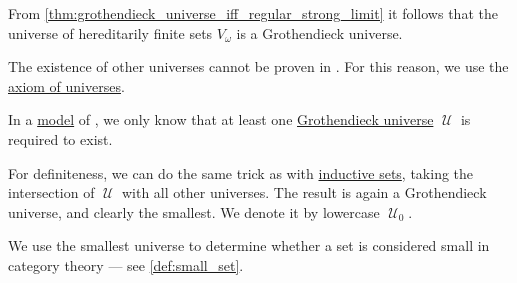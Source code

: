\begin{example}\label{ex:def:axiom_of_universes}
  From \cref{thm:grothendieck_universe_iff_regular_strong_limit} it follows that the universe of hereditarily finite sets \hyperref[def:universe_of_hereditary_finite_sets]{\( V_\omega \)} is a Grothendieck universe.

  The existence of other universes cannot be proven in . For this reason, we use the \hyperref[def:axiom_of_universes]{axiom of universes}.
\end{example}

\begin{definition}\label{def:smallest_grothendieck_universe}\mimprovised
  In a \hyperref[def:fol_semantics/model]{model} of \hyperref[def:axiom_of_universes]{}, we only know that at least one \hyperref[def:grothendieck_universe]{Grothendieck universe} \( \mscrU \) is required to exist.

  For definiteness, we can do the same trick as with \hyperref[def:inductive_set]{inductive sets}, taking the intersection of \( \mscrU \) with all other universes. The result is again a Grothendieck universe, and clearly the smallest. We denote it by lowercase \( \mscrU_0 \).
\end{definition}
\begin{comments}
  \item We use the smallest universe to determine whether a set is considered small in category theory --- see \cref{def:small_set}.
\end{comments}

